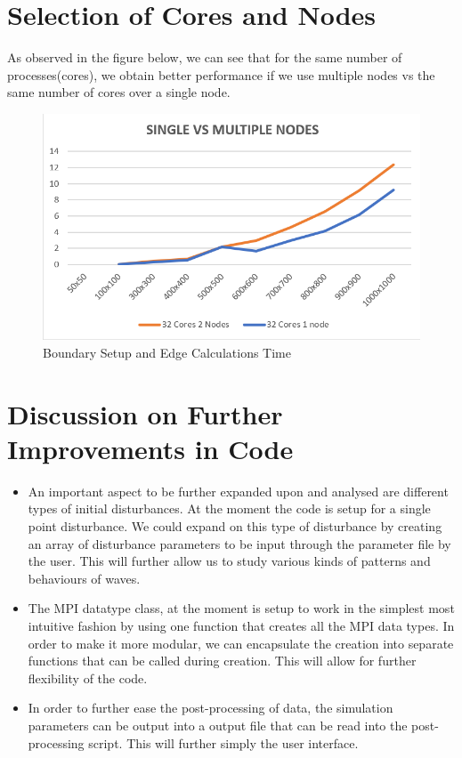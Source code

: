 \documentclass[twoside,twocolumn]{article}
\begin{document}
\section{Selection of Cores and Nodes}
As observed in the figure below, we can see that for the same number of processes(cores), we obtain better performance if we use multiple nodes vs the same number of cores over a single node.
\vspace{-4mm}
\begin{figure}[H]
\centering
\includegraphics[height=5.5 cm\textwidth]{images/SINGLEVSMULTIPLENODES.png}
\caption{Boundary Setup and Edge Calculations Time}
\end{figure}
\vspace{-4mm}

\section{Discussion on Further Improvements in Code}
\begin{itemize}
\item An important aspect to be further expanded upon and analysed are different types of initial disturbances. At the moment the code is setup for a single point disturbance. We could expand on this type of disturbance by creating an array of disturbance parameters to be input through the parameter file by the user. This will further allow us to study various kinds of patterns and behaviours of waves.
\item The MPI datatype class, at the moment is setup to work in the simplest most intuitive fashion by using one function that creates all the MPI data types. In order to make it more modular, we can encapsulate the creation into separate functions that can be called during creation. This will allow for further flexibility of the code.
\item In order to further ease the post-processing of data, the simulation parameters can be output into a output file that can be read into the post-processing script. This will further simply the user interface.

\end{itemize}
\end{document}
